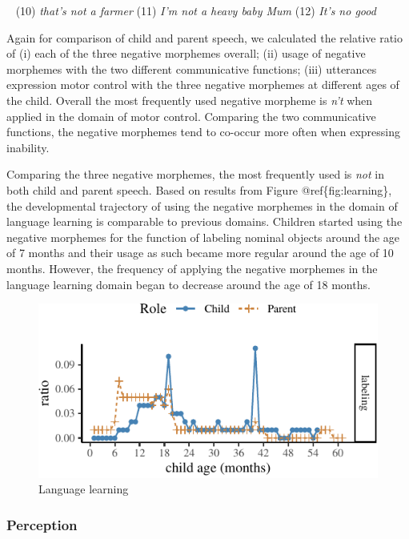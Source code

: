 \documentclass[10pt, letterpaper]{article}
\newenvironment{CodeChunk}{}{}
\begin{document}
~ (10) \emph{that's not a farmer} (11) \emph{I'm not a heavy baby Mum}
(12) \emph{It's no good} ~

Again for comparison of child and parent speech, we calculated the
relative ratio of (i) each of the three negative morphemes overall; (ii)
usage of negative morphemes with the two different communicative
functions; (iii) utterances expression motor control with the three
negative morphemes at different ages of the child. Overall the most
frequently used negative morpheme is \emph{n't} when applied in the
domain of motor control. Comparing the two communicative functions, the
negative morphemes tend to co-occur more often when expressing
inability.

Comparing the three negative morphemes, the most frequently used is
\emph{not} in both child and parent speech. Based on results from Figure
@ref\{fig:learning\}, the developmental trajectory of using the negative
morphemes in the domain of language learning is comparable to previous
domains. Children started using the negative morphemes for the function
of labeling nominal objects around the age of 7 months and their usage
as such became more regular around the age of 10 months. However, the
frequency of applying the negative morphemes in the language learning
domain began to decrease around the age of 18 months.

\begin{CodeChunk}
\begin{figure}[H]

{\centering \includegraphics{figs/learning-1} 

}

\caption[Language learning]{Language learning}\label{fig:learning}
\end{figure}
\end{CodeChunk}

\hypertarget{perception}{%
\subsubsection{Perception}\label{perception}}
\end{document}
